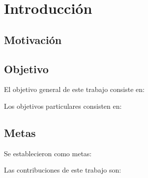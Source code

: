 \chapter{Introducción}
\label{cap:intro}

\section{Motivación}
 
\section{Objetivo}

El objetivo general de este trabajo consiste en:

Los objetivos particulares consisten en:




\section{Metas}

Se establecieron como metas:


Las contribuciones de este trabajo son:



